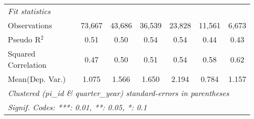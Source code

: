 \begin{tabular}{lcccccc}
   \midrule
   \emph{Fit statistics}\\
   Observations                                               & 73,667       & 43,686  & 36,539        & 23,828       & 11,561        & 6,673\\  
   Pseudo R$^2$                                               & 0.51         & 0.50    & 0.54          & 0.54         & 0.44          & 0.43\\  
   Squared Correlation                                        & 0.47         & 0.50    & 0.51          & 0.54         & 0.58          & 0.62\\  
Mean(Dep. Var.) & 1.075 & 1.566 & 1.650 & 2.194 & 0.784 & 1.157 \\
   \midrule \midrule
   \multicolumn{7}{l}{\emph{Clustered (pi\_id \& quarter\_year) standard-errors in parentheses}}\\
   \multicolumn{7}{l}{\emph{Signif. Codes: ***: 0.01, **: 0.05, *: 0.1}}\\
\end{tabular}
\par\endgroup
